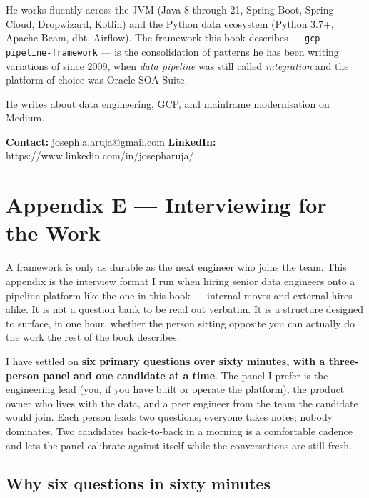 \documentclass[
  11pt,
  british,
  oneside]{book}
\begin{document}
He works fluently across the JVM (Java 8 through 21, Spring Boot, Spring
Cloud, Dropwizard, Kotlin) and the Python data ecosystem (Python 3.7+,
Apache Beam, dbt, Airflow). The framework this book describes ---
\texttt{gcp-pipeline-framework} --- is the consolidation of patterns he
has been writing variations of since 2009, when \emph{data pipeline} was
still called \emph{integration} and the platform of choice was Oracle
SOA Suite.

He writes about data engineering, GCP, and mainframe modernisation on
Medium.

\textbf{Contact:} joseph.a.aruja@gmail.com \textbf{LinkedIn:}
https://www.linkedin.com/in/josepharuja/

\newpage

\printindex

\newpage

\hypertarget{appendix-e-interviewing-for-the-work}{%
\chapter{Appendix E --- Interviewing for the
Work}\label{appendix-e-interviewing-for-the-work}}

A framework is only as durable as the next engineer who joins the team.
This appendix is the interview format I run when hiring senior data
engineers onto a pipeline platform like the one in this book ---
internal moves and external hires alike. It is not a question bank to be
read out verbatim. It is a structure designed to surface, in one hour,
whether the person sitting opposite you can actually do the work the
rest of the book describes.

I have settled on \textbf{six primary questions over sixty minutes, with
a three-person panel and one candidate at a time}.
The panel I prefer is the engineering lead (you, if you have built or
operate the platform), the product owner who lives with the data, and a
peer engineer from the team the candidate would join. Each person leads
two questions; everyone takes notes; nobody dominates. Two candidates
back-to-back in a morning is a comfortable cadence and lets the panel
calibrate against itself while the conversations are still fresh.

\hypertarget{why-six-questions-in-sixty-minutes}{%
\section{Why six questions in sixty
minutes}\label{why-six-questions-in-sixty-minutes}}
\end{document}
